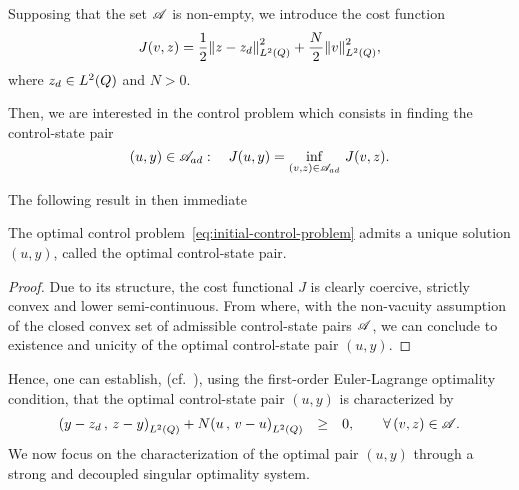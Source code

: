 Supposing that the set $\mathscr{A}$ is non-empty, we introduce the cost function
\begin{equation*}\label{eq:initial-cost-function}
    J(v,z) = \dfrac{1}{2}{\left\|{z - z_{d} }\right\|}_{L^{2}\left({Q}\right)}^{2} + \dfrac{N}{2}{\left\|{v }\right\|}_{L^{2}\left({Q}\right)}^{2},
\end{equation*}
where $z_{d}\in L^{2}\!\left({Q}\right)$ and $N > 0$.

Then, we are interested in the control problem which consists in finding
the control-state pair
\begin{equation}\label{eq:initial-control-problem}
    (u,y)\in {\mathscr{A}}_{ad}:\quad J(u,y) = \inf_{(v,z)\in
    {\mathscr{A}}_{ad}}\,J(v,z).
\end{equation}

The following result in then immediate
\begin{theoreme}%
    The optimal control problem~\eqref{eq:initial-control-problem} admits a
    unique solution $(u,y)$, called the optimal control-state pair.
\end{theoreme}

\begin{proof}%
    Due to its structure, the cost functional $J$ is clearly coercive,
    strictly convex and lower semi-continuous. From where, with the
    non-vacuity assumption of the closed convex set of admissible
    control-state pairs $\mathscr{A}$, we can conclude to existence and unicity
    of the optimal control-state pair $(u,y)$.
\end{proof}

Hence, one can establish, (cf.~\cite{lions2}), using the first-order
Euler-Lagrange optimality condition, that the optimal control-state pair
$(u,y)$ is characterized by
\begin{equation*}\label{eq:initial-variational-inequation}
    \begin{array}{rcl}
        \scalaireq{%
            y - z_{d}
        }{%
            z - y
        } + N\scalaireq{u}{v - u} & \geq & 0,\qquad \forall\,(v,z)\in\Ascr.
    \end{array}
\end{equation*}
We now focus on the characterization of the optimal pair $(u,y)$ through a
strong and decoupled singular optimality system.


